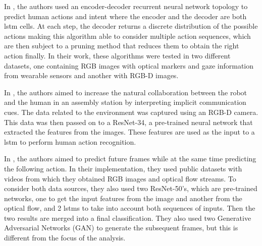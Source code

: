 In \textcite{Schydlo2018}, the authors used an encoder-decoder recurrent neural network topology to predict human actions and intent where the encoder and the decoder are both \acs{lstm} cells. At each step, the decoder returns a discrete distribution of the possible actions making this algorithm able to consider multiple action sequences, which are then subject to a pruning method that reduces them to obtain the right action finally. In their work, these algorithms were tested in two different datasets, one containing RGB images with optical markers and gaze information from wearable sensors and another with RGB-D images.

In \textcite{Moutinho2023}, the authors aimed to increase the natural collaboration between the robot and the human in an assembly station by interpreting implicit communication cues. The data related to the environment was captured using an RGB-D camera. This data was then passed on to a ResNet-34, a pre-trained neural network that extracted the features from the images. These features are used as the input to a \acs{lstm} to perform human action recognition.

In \textcite{Gammulle2019}, the authors aimed to predict future frames while at the same time predicting the following action. In their implementation, they used public datasets with videos from which they obtained RGB images and optical flow streams. To consider both data sources, they also used two ResNet-50's, which are pre-trained networks, one to get the input features from the image and another from the optical flow, and 2 \acs{lstm}s to take into account both sequences of inputs. Then the two results are merged into a final classification. They also used two Generative Adversarial Networks (GAN) to generate the subsequent frames, but this is different from the focus of the analysis.


